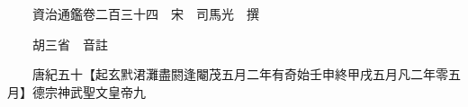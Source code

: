 










 


 
 


 

  
  
  
  
  





  
  
  
  
  
 
  

  

  
  
  



  

 
 

  
   




  

  
  


  　　資治通鑑卷二百三十四　宋　司馬光　撰

　　胡三省　音註

　　唐紀五十【起玄黓涒灘盡閼逢閹茂五月二年有奇始壬申終甲戌五月凡二年零五月】德宗神武聖文皇帝九

